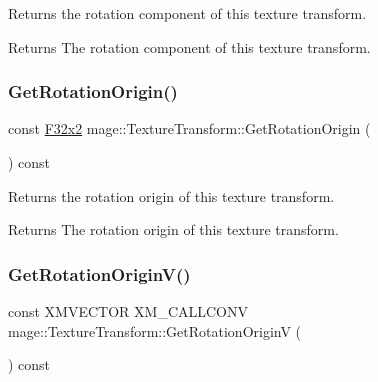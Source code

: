 Returns the rotation component of this texture transform.

\begin{DoxyReturn}{Returns}
The rotation component of this texture transform. 
\end{DoxyReturn}
\hypertarget{classmage_1_1_texture_transform_a22ace56e39d1987fb0d46982536121fe}{}\label{classmage_1_1_texture_transform_a22ace56e39d1987fb0d46982536121fe} 
\subsubsection{\texorpdfstring{Get\+Rotation\+Origin()}{GetRotationOrigin()}}
{\footnotesize\ttfamily const \hyperlink{namespacemage_aa87237ad091f5cd7da612b8523fc108f}{F32x2} mage\+::\+Texture\+Transform\+::\+Get\+Rotation\+Origin (\begin{DoxyParamCaption}{ }\end{DoxyParamCaption}) const\hspace{0.3cm}{\ttfamily [noexcept]}}

Returns the rotation origin of this texture transform.

\begin{DoxyReturn}{Returns}
The rotation origin of this texture transform. 
\end{DoxyReturn}
\hypertarget{classmage_1_1_texture_transform_a62a64589318d6cdc6792f732a34468a1}{}\label{classmage_1_1_texture_transform_a62a64589318d6cdc6792f732a34468a1} 
\subsubsection{\texorpdfstring{Get\+Rotation\+Origin\+V()}{GetRotationOriginV()}}
{\footnotesize\ttfamily const X\+M\+V\+E\+C\+T\+OR X\+M\+\_\+\+C\+A\+L\+L\+C\+O\+NV mage\+::\+Texture\+Transform\+::\+Get\+Rotation\+OriginV (\begin{DoxyParamCaption}{ }\end{DoxyParamCaption}) const\hspace{0.3cm}{\ttfamily [noexcept]}}

